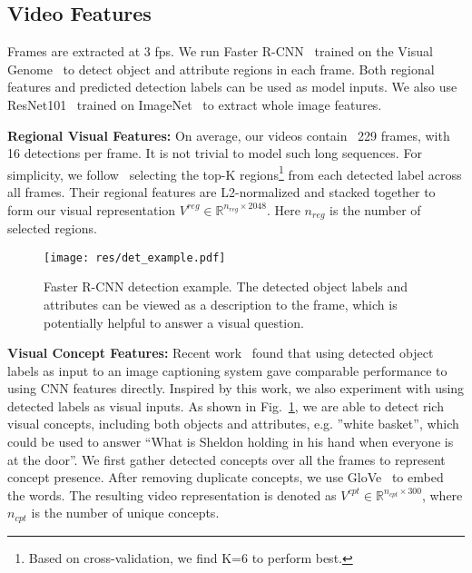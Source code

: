 \documentclass[11pt,a4paper]{article}
\begin{document}
\subsection{Video Features}
Frames are extracted at 3 fps. We run Faster R-CNN~\cite{Ren2015FasterRT} trained on the Visual Genome~\cite{Krishna2017DenseCaptioningEI} to detect object and attribute regions in each frame.  Both regional features and predicted detection labels can be used as model inputs. We also use ResNet101~\citep{He2016DeepRL} trained on ImageNet~\citep{Deng2009ImageNetAL} to extract whole image features.

\noindent\textbf{Regional Visual Features:} On average, our videos contain ~229 frames, with 16 detections per frame. 
It is not trivial to model such long sequences.
For simplicity, we follow~\cite{Anderson2017BottomUpAT, karpathy2015deep} selecting the top-K regions\footnote{Based on cross-validation, we find K=6 to perform best.} from each detected label across all frames.
Their regional features are L2-normalized and stacked together to form our visual representation $V^{reg} \in \mathbb{R}^{n_{reg} \times 2048}$. 
Here $n_{reg}$ is the number of selected regions.


\begin{figure}[t]
  \texttt{[image: res/det\_example.pdf]}
  \vspace{-20pt}
  \caption{Faster R-CNN detection example. The detected object labels and attributes can be viewed as a description to the frame, which is potentially helpful to answer a visual question.}
  \label{fig:detection_example}
  \vspace{-5pt}
\end{figure}


\noindent\textbf{Visual Concept Features:} 
Recent work~\cite{yin2017obj2text} found that using detected object labels as input to an image captioning system gave comparable performance to using CNN features directly. Inspired by this work, we also experiment with using detected labels as visual inputs. As shown in Fig.~\ref{fig:detection_example}, we are able to detect rich visual concepts, including both objects and attributes, e.g. ''white basket'', which could be used to answer ``What is Sheldon holding in his hand when everyone is at the door''.
We first gather detected concepts over all the frames to represent concept presence. After removing duplicate concepts, we use GloVe~\citep{Pennington2014GloveGV} to embed the words. The resulting video representation is denoted as $V^{cpt} \in \mathbb{R}^{n_{cpt} \times 300}$, where $n_{cpt}$ is the number of unique concepts.
\end{document}
